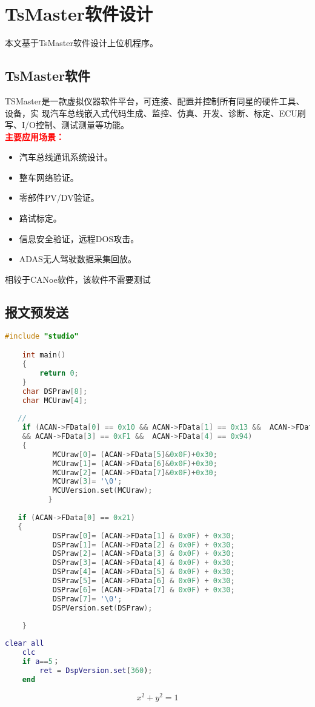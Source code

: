 \chapter{TsMaster软件设计}

本文基于TsMaster软件设计上位机程序。


\section{TsMaster软件}
TSMaster是一款虚拟仪器软件平台，可连接、配置并控制所有同星的硬件工具、设备，实
现汽车总线嵌入式代码生成、监控、仿真、开发、诊断、标定、ECU刷写、I/O控制、测试测量等功能。\\
\textbf{\textcolor{red}{主要应用场景：}}
\begin{itemize}
	\kaishu
	\item 汽车总线通讯系统设计。
	\item 整车网络验证。
	\item 零部件PV/DV验证。
	\item 路试标定。
	\item 信息安全验证，远程DOS攻击。
	\item ADAS无人驾驶数据采集回放。
\end{itemize}
相较于CANoe软件，该软件不需要测试


\section{报文预发送}
\begin{lstlisting}[language=c]
	#include "studio"

	int main()
	{
		return 0;
	}
	char DSPraw[8];
	char MCUraw[4];
	   
   // 
	if (ACAN->FData[0] == 0x10 && ACAN->FData[1] == 0x13 &&  ACAN->FData[2] == 0x62
	&& ACAN->FData[3] == 0xF1 &&  ACAN->FData[4] == 0x94)
	{
		   MCUraw[0]= (ACAN->FData[5]&0x0F)+0x30;
		   MCUraw[1]= (ACAN->FData[6]&0x0F)+0x30;
		   MCUraw[2]= (ACAN->FData[7]&0x0F)+0x30;
		   MCUraw[3]= '\0'; 
		   MCUVersion.set(MCUraw);
		  }
		  
   if (ACAN->FData[0] == 0x21)
   {
		   DSPraw[0]= (ACAN->FData[1] & 0x0F) + 0x30;
		   DSPraw[1]= (ACAN->FData[2] & 0x0F) + 0x30;
		   DSPraw[2]= (ACAN->FData[3] & 0x0F) + 0x30;
		   DSPraw[3]= (ACAN->FData[4] & 0x0F) + 0x30;
		   DSPraw[4]= (ACAN->FData[5] & 0x0F) + 0x30;
		   DSPraw[5]= (ACAN->FData[6] & 0x0F) + 0x30;
		   DSPraw[6]= (ACAN->FData[7] & 0x0F) + 0x30;
		   DSPraw[7]= '\0';
		   DSPVersion.set(DSPraw); 
   
	} 
\end{lstlisting}

\begin{lstlisting}[language=matlab]
	clear all
	clc
	if a==5；
		ret = DspVersion.set(360);
	end
\end{lstlisting}


\begin{equation}
	x^2 + y^2 = 1 
\end{equation}









